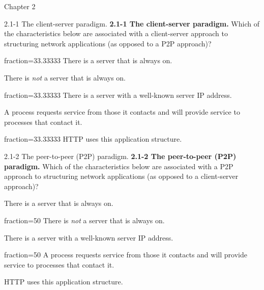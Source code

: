 \documentclass[11pt]{article}
\begin{document}
\begin{quiz}{Chapter 2}

\begin{multi}[points=1,shuffle,multiple,]{2.1-1 The client-server paradigm.}
\textbf{2.1-1 The client-server paradigm.} Which of the characteristics below are associated with a client-server approach to structuring network applications (as opposed to a P2P approach)?
\item[fraction=33.33333] There is a server that is always on.
\item There is \emph{not} a server that is always on.
\item[fraction=33.33333] There is a server with a well-known server IP address.
\item A process requests service from those it contacts and will provide service to processes that contact it.
\item[fraction=33.33333] HTTP uses this application structure.
\end{multi}

\begin{multi}[points=1,shuffle,multiple]{2.1-2 The peer-to-peer (P2P) paradigm.}
\textbf{2.1-2 The peer-to-peer (P2P) paradigm.} Which of the characteristics below are associated with a P2P approach to structuring network applications (as opposed to a client-server approach)?
\item There is a server that is always on.
\item[fraction=50] There is \emph{not} a server that is always on.
\item There is a server with a well-known server IP address.
\item[fraction=50] A process requests service from those it contacts and will provide service to processes that contact it.
\item HTTP uses this application structure.
\end{multi}


\end{quiz}
\end{document}
